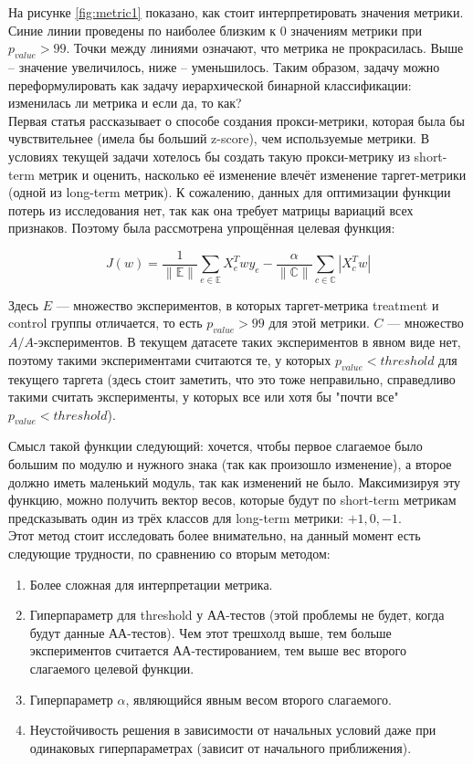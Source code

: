 \documentclass{article}
\begin{document}
	На рисунке \ref{fig:metric1} показано, как стоит интерпретировать значения метрики. Синие линии проведены по наиболее близким к 0 значениям метрики при $p_{value} > 99$. Точки между линиями означают, что метрика не прокрасилась. Выше -- значение увеличилось, ниже -- уменьшилось. Таким образом, задачу можно переформулировать как задачу иерархической бинарной классификации: изменилась ли метрика и если да, то как? \\
	
	Первая статья рассказывает о способе создания прокси-метрики, которая была бы чувствительнее (имела бы больший z-score), чем используемые метрики. В условиях текущей задачи хотелось бы создать такую прокси-метрику из short-term метрик и оценить, насколько её изменение влечёт изменение таргет-метрики (одной из long-term метрик).
	К сожалению, данных для оптимизации функции потерь из исследования нет, так как она требует матрицы вариаций всех признаков. Поэтому была рассмотрена упрощённая целевая функция:
	
	$$J(w) = \frac{1}{\|\mathbb{E}\|}\sum_{e\in \mathbb{E}}X_e^T wy_e - \frac{\alpha}{\|\mathbb{C}\|}\sum_{c\in \mathbb{C}}|X_c^T w| %
	$$
	
	Здесь $E$ --- множество экспериментов, в которых таргет-метрика treatment и control группы отличается, то есть $p_{value} > 99$ для этой метрики. $C$ --- множество $A/A$-экспериментов. В текущем датасете таких экспериментов в явном виде нет, поэтому такими экспериментами считаются те, у которых $p_{value} < threshold$ для текущего таргета (здесь стоит заметить, что это тоже неправильно, справедливо такими считать эксперименты, у которых все или хотя бы "почти все" $p_{value} <threshold $).
	
	Смысл такой функции следующий: хочется, чтобы первое слагаемое было большим по модулю и нужного знака (так как произошло изменение), а второе должно иметь маленький модуль, так как изменений не было. Максимизируя эту функцию, можно получить вектор весов, которые будут по short-term метрикам предсказывать один из трёх классов для long-term метрики: $+1, 0, -1$. \\

	Этот метод стоит исследовать более внимательно, на данный момент есть следующие трудности, по сравнению со вторым методом:
	\begin{enumerate}
		\item Более сложная для интерпретации метрика.
		\item Гиперпараметр для threshold у АА-тестов (этой проблемы не будет, когда будут данные АА-тестов). Чем этот трешхолд выше, тем больше экспериментов считается АА-тестированием, тем выше вес второго слагаемого целевой функции.
		\item Гиперпараметр $\alpha$, являющийся явным весом второго слагаемого.
		\item Неустойчивость решения в зависимости от начальных условий даже при одинаковых гиперпараметрах (зависит от начального приближения).
	\end{enumerate}
		
\end{document}

